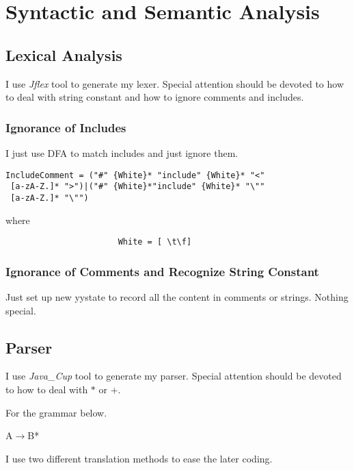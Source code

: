 \documentclass[journal]{IEEEtran}
\begin{document}
\section{Syntactic and Semantic Analysis}

\subsection{Lexical Analysis}

I use \textit{Jflex} tool to generate my lexer. Special attention should be devoted to how to deal with string constant and how to ignore comments and includes.

\subsubsection{Ignorance of Includes}

I just use DFA to match includes and just ignore them.
\begin{scriptsize}
\begin{lstlisting}
IncludeComment = ("#" {White}* "include" {White}* "<"
 [a-zA-Z.]* ">")|("#" {White}*"include" {White}* "\"" 
 [a-zA-Z.]* "\"")
\end{lstlisting}
\end{scriptsize}
where 
\begin{scriptsize}
\begin{lstlisting}
                       White = [ \t\f]
\end{lstlisting}
\end{scriptsize}

\subsubsection{Ignorance of Comments and Recognize String Constant}
Just set up new yystate to record all the content in comments or strings. Nothing special.

\subsection{Parser}

I use \textit{Java\_Cup} tool to generate my parser. Special attention should be devoted to how to deal with $*$ or $+$.

For the grammar below.
\begin{center}
A$\rightarrow$B*
\end{center}
I use two different translation methods to ease the later coding. 
\end{document}
